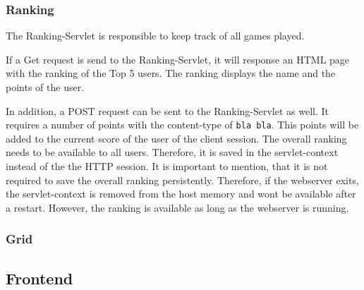 \subsubsection{Ranking}\label{subsubsec:03_impl_backend_ranking}
The Ranking-Servlet is responsible to keep track of all games played.

If a Get request is send to the Ranking-Servlet, it will response an HTML page with the ranking of the Top 5 users. The ranking displays the name and the points of the user.

In addition, a POST request can be sent to the Ranking-Servlet as well. It requires a number of points with the content-type of \texttt{bla bla}.
This points will be added to the current score of the user of the client session.
The overall ranking needs to be available to all users. Therefore, it is saved in the servlet-context instead of the the HTTP session.
It is important to mention, that it is not required to save the overall ranking persistently. Therefore, if the webserver exits, the servlet-context is removed from the host memory and wont be available after a restart. However, the ranking is available as long as the webserver is running.

\subsubsection{Grid}\label{subsubsec:03_impl_backend_grid}


\subsection{Frontend}\label{subsec:03_impl_frontend}


